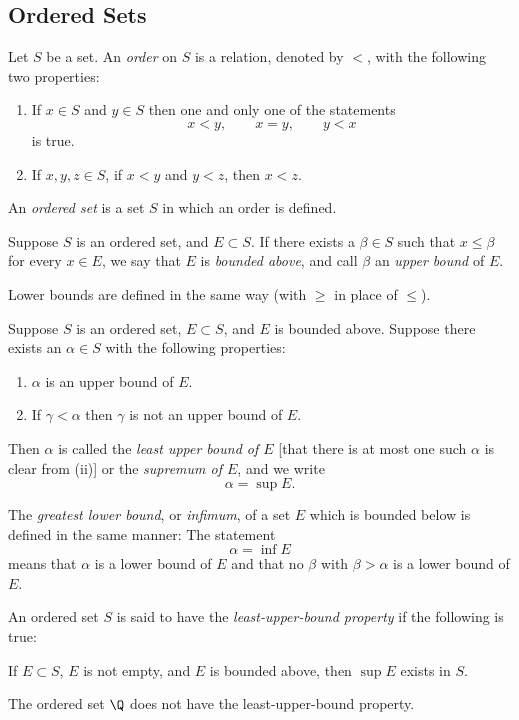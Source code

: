 \subsection{Ordered Sets}
\begin{definition}
Let $S$ be a set. An \emph{order} on $S$ is a relation, denoted by $<$, with the following two properties:
\begin{enumerate}
\item[(i)] If $x \in S$ and $y \in S$ then one and only one of the statements 
\[
x<y, \qquad x=y, \qquad y<x
\]
is true.
\item[(ii)] If $x,y,z \in S$, if $x<y$ and $y<z$, then $x<z$.
\end{enumerate}
\end{definition}
\begin{definition}
An \emph{ordered set} is a set $S$ in which an order is defined.
\end{definition}
\begin{definition}
Suppose $S$ is an ordered set, and $E \subset S$. If there exists a $\beta \in S$ such that $x \leq \beta$ for every $x \in E$, we say that $E$ is \emph{bounded above}, and call $\beta$ an \emph{upper bound} of $E$.

Lower bounds are defined in the same way (with $\geq$ in place of $\leq$).
\end{definition}
\begin{definition}
Suppose $S$ is an ordered set, $E \subset S$, and $E$ is bounded above. Suppose there exists an $\alpha \in S$ with the following properties: 
\begin{enumerate}
    \item[(i)] $\alpha$ is an upper bound of $E$.
    \item[(ii)] If $\gamma < \alpha$ then $\gamma$ is not an upper bound of $E$.
\end{enumerate}

Then $\alpha$ is called the \emph{least upper bound of $E$} [that there is at most one such $\alpha$ is clear from (ii)] or the \emph{supremum of $E$}, and we write \[\alpha=\sup E.\]

The \emph{greatest lower bound}, or \emph{infimum}, of a set $E$ which is bounded below is defined in the same manner: The statement \[\alpha=\inf E\] means that $\alpha$ is a lower bound of $E$ and that no $\beta$ with $\beta > \alpha$ is a lower bound of $E$.
\end{definition}
\begin{definition}
An ordered set $S$ is said to have the \emph{least-upper-bound property} if the following is true:

If $E \subset S$, $E$ is not empty, and $E$ is bounded above, then $\sup E$ exists in $S$.
\end{definition}
\begin{remark}
    The ordered set $\Q$ does not have the least-upper-bound property.
\end{remark}

